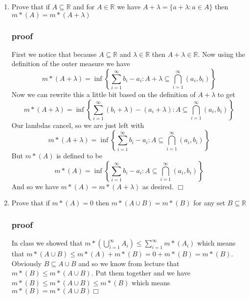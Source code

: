 \documentclass[letterpaper]{article}
\begin{document}
\begin{enumerate}
\item
Prove that if $A\subseteq \mathbb{R}$ and for $A\in \mathbb{R}$ we have $A+\lambda=\{a+\lambda:a\in A\}$ then $m*(A)=m*(A+\lambda)$
\subsubsection*{proof}
First we notice that because
$A\subseteq \mathbb{R}$
and $\lambda\in \mathbb{R}$
then $A+\lambda\in \mathbb{R}$.
Now using the definition of the outer measure we have
\[m*(A+\lambda)=\inf\left\{\sum\limits_{i=1}^\infty{b_i-a_i:A+\lambda\subseteq\bigcap\limits_{i=1}^\infty(a_i,b_i)}\right\}\]
Now we can rewrite this a little bit based on the definition of $A+\lambda$ to get
\[m*(A+\lambda)=\inf\left\{\sum\limits_{i=1}^\infty{(b_i+\lambda)-(a_i+\lambda):A\subseteq\bigcap\limits_{i=1}^\infty(a_i,b_i)}\right\}\]
Our lambdas cancel, so we are just left with
\[m*(A+\lambda)=\inf\left\{\sum\limits_{i=1}^\infty{b_i-a_i:A\subseteq\bigcap\limits_{i=1}^\infty(a_i,b_i)}\right\}\]
But $m*(A)$ is defined to be 
\[m*(A)=\inf\left\{\sum\limits_{i=1}^\infty{b_i-a_i:A\subseteq\bigcap\limits_{i=1}^\infty(a_i,b_i)}\right\}\]
And so we have $m*(A)=m*(A+\lambda)$ as desired.
$\Box$
\item
Prove that if $m*(A)=0$ then $m*(A\cup B)=m*(B)$ for any set $B\subseteq\mathbb{R}$
\subsubsection*{proof}
In class we showed that $m*\left(\bigcup\limits_{i=1}^\infty A_i\right)\le  \sum\limits_{i=1}^\infty{m*(A_i)}$ which means that $m*(A\cup B)\le m*(A)+m*(B)=0+m*(B)=m*(B)$.
Obviously $B\subseteq A\cup B$ and so we know from lecture that $m*(B)\le m*(A\cup B)$. Put them together and we have $m*(B)\le m*(A\cup B)\le m*(B)$ which means $m*(B)=m*(A\cup B)\Box$
\end{enumerate}
\end{document}
